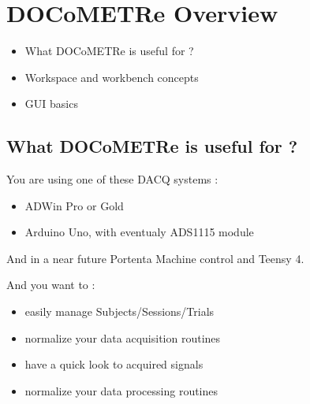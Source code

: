 \documentclass[a4paper,11pt]{beamer}
\begin{document}
\section{DOCoMETRe Overview}
\begin{frame}
\begin{itemize}
    \item What DOCoMETRe is useful for ?
    \item Workspace and workbench concepts
    \item GUI basics
\end{itemize}

\end{frame}


\subsection{What DOCoMETRe is useful for ?}
\begin{frame}
\begin{exampleblock}{You are using one of these DACQ systems :}
    \begin{itemize}
        \item ADWin Pro or Gold
        \item Arduino Uno, with eventualy ADS1115 module
    \end{itemize}
\centering
And in a near future Portenta Machine control and Teensy 4.
\end{exampleblock}

\begin{exampleblock}{And you want to :}
    \begin{itemize}
        \item easily manage Subjects/Sessions/Trials
        \item normalize your data acquisition routines
        \item have a quick look to acquired signals
        \item normalize your data processing routines
    \end{itemize}
\end{exampleblock}
\end{frame}
\end{document}
